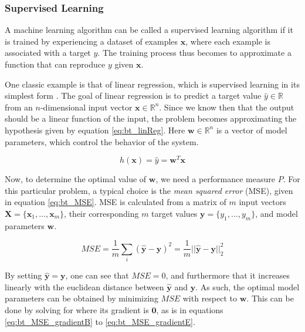 \subsubsection{Supervised Learning}

A machine learning algorithm can be called a supervised learning algorithm if it is trained by experiencing a dataset of examples $\mathbf{x}$, where each example is associated with a target $y$. The training process thus becomes to approximate a function that can reproduce $y$ given $\mathbf{x}$.

One classic example is that of linear regression, which is supervised learning in its simplest form \cite{goodfellow2016}. The goal of linear regression is to predict a target value $\hat{y}\in\mathbb{R}$ from an $n$-dimensional input vector $\mathbf{x}\in\mathbb{R}^n$. Since we know then that the output should be a linear function of the input, the problem becomes approximating the hypothesis given by equation \ref{eq:bt_linReg}. Here $\mathbf{w}\in\mathbb{R}^n$ is a vector of model parameters, which control the behavior of the system.

\begin{equation}
    \label{eq:bt_linReg}
    h(\mathbf{x})=\hat{y}=\mathbf{w}^T\mathbf{x}
\end{equation}

Now, to determine the optimal value of $\mathbf{w}$, we need a performance measure $P$. For this particular problem, a typical choice is the \textit{mean squared error} (MSE), given in equation \ref{eq:bt_MSE}. MSE is calculated from a matrix of $m$ input vectors $\mathbf{X}=\{\mathbf{x}_1,\dots,\mathbf{x}_m\}$, their corresponding $m$ target values $\mathbf{y}=\{y_1,\dots,y_m\}$, and model parameters $\mathbf{w}$.

\begin{equation}
    \label{eq:bt_MSE}
    MSE=\frac{1}{m}\sum_{i}(\hat{\mathbf{y}}-\mathbf{y})^2
    =\frac{1}{m}||\hat{\mathbf{y}}-\mathbf{y}||^2_2
\end{equation}

By setting $\hat{\mathbf{y}}=\mathbf{y}$, one can see that $MSE=0$, and furthermore that it increases linearly with the euclidean distance between $\hat{\mathbf{y}}$ and $\mathbf{y}$. As such, the optimal model parameters can be obtained by minimizing $MSE$ with respect to $\mathbf{w}$. This can be done by solving for where its gradient is $\mathbf{0}$, as is in equations \ref{eq:bt_MSE_gradientB} to \ref{eq:bt_MSE_gradientE}.

